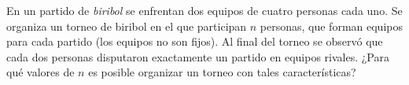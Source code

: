 En un partido de \emph{biribol} se enfrentan dos equipos de cuatro personas cada uno. Se organiza un torneo de biribol en el que participan $n$ personas, que forman equipos para cada partido (los equipos no son fijos). Al final del torneo se observó que cada dos personas disputaron exactamente un partido en equipos rivales. ¿Para qué valores de $n$ es posible organizar un torneo con tales características?

